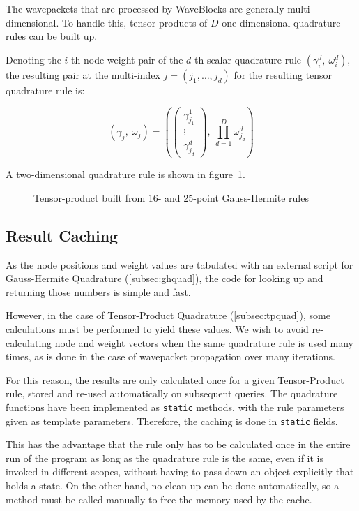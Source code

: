 The wavepackets that are processed by WaveBlocks are generally multi-dimensional.
To handle this, tensor products of $D$ one-dimensional quadrature rules can be
built up.

Denoting the $i$-th node-weight-pair of the $d$-th scalar quadrature rule
$(\gamma_i^d,\ \omega_i^d)$, the resulting pair at the multi-index $j = (j_1,
\ldots, j_d)$ for the resulting tensor quadrature rule is:

\begin{equation}
  (\gamma_j,\ \omega_j) = \left(
    \begin{pmatrix} \gamma_{j_1}^1 \\ \vdots \\ \gamma_{j_d}^d \end{pmatrix},
    \ \prod_{d=1}^D \omega_{j_d}^d
  \right)
\end{equation}

A two-dimensional quadrature rule is shown in figure~\ref{fig:tpexample}.

\begin{figure}
  \center
  
  \caption{Tensor-product built from 16- and 25-point Gauss-Hermite rules}
  \label{fig:tpexample}
\end{figure}


\subsection{Result Caching}

As the node positions and weight values are tabulated with an external script
for Gauss-Hermite Quadrature (\ref{subsec:ghquad}), the code for looking up and
returning those numbers is simple and fast.

However, in the case of Tensor-Product Quadrature (\ref{subsec:tpquad}), some
calculations must be performed to yield these values.
We wish to avoid re-calculating node and weight vectors when the same quadrature
rule is used many times, as is done in the case of wavepacket propagation over
many iterations.

For this reason, the results are only calculated once for a given Tensor-Product
rule, stored and re-used automatically on subsequent queries.
The quadrature functions have been implemented as \texttt{static} methods, with
the rule parameters given as template parameters.
Therefore, the caching is done in \texttt{static} fields.

This has the advantage that the rule only has to be calculated once in the
entire run of the program as long as the quadrature rule is the same, even if it
is invoked in different scopes, without having to pass down an object explicitly
that holds a state.
On the other hand, no clean-up can be done automatically, so a method must be
called manually to free the memory used by the cache.
